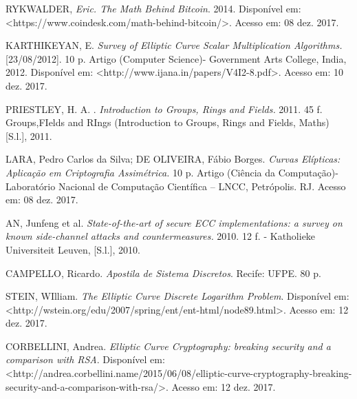 \documentclass[14pt, oneside]{book}
\theoremstyle{definition}
\begin{document}
            \begin{thebibliography}{1}

                 RYKWALDER, {\em Eric. The Math Behind Bitcoin}. 2014. Disponível em: <https://www.coindesk.com/math-behind-bitcoin/>. Acesso em: 08 dez. 2017.

                  KARTHIKEYAN, E. {\em Survey of Elliptic Curve Scalar Multiplication Algorithms.} [23/08/2012]. 10 p. Artigo (Computer Science)- Government Arts College, India, 2012. Disponível em: <http://www.ijana.in/papers/V4I2-8.pdf>. Acesso em: 10 dez. 2017. 

                 PRIESTLEY, H. A. . {\em Introduction to Groups, Rings and Fields.} 2011. 45 f. Groups,FIelds and RIngs (Introduction to Groups, Rings and Fields, Maths) [S.l.], 2011.

                 LARA, Pedro Carlos da Silva; DE OLIVEIRA, Fábio Borges. {\em Curvas Elípticas: Aplicação em Criptografia Assimétrica.} 10 p. Artigo (Ciência da Computação)- Laboratório Nacional de Computação Científica – LNCC, Petrópolis. RJ. Acesso em: 08 dez. 2017. 

                 AN, Junfeng et al. {\em State-of-the-art of secure ECC implementations: a survey on known side-channel attacks and countermeasures.} 2010. 12 f. - Katholieke Universiteit Leuven, [S.l.], 2010.
                
                 CAMPELLO, Ricardo. {\em Apostila de Sistema Discretos}. Recife: UFPE. 80 p.
                
                 STEIN, WIlliam. {\em The Elliptic Curve Discrete Logarithm Problem}. Disponível em: <http://wstein.org/edu/2007/spring/ent/ent-html/node89.html>. Acesso em: 12 dez. 2017.
                
                 CORBELLINI, Andrea. {\em Elliptic Curve Cryptography: breaking security and a comparison with RSA}. Disponível em: <http://andrea.corbellini.name/2015/06/08/elliptic-curve-cryptography-breaking-security-and-a-comparison-with-rsa/>. Acesso em: 12 dez. 2017.
            \end{thebibliography}
\end{document}
